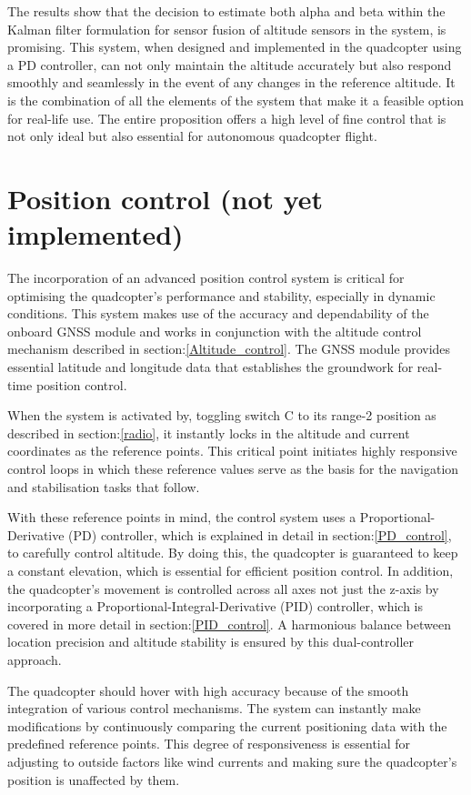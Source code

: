 \documentclass{report}
\begin{document}
The results show that the decision to estimate both alpha and beta within the
Kalman filter formulation for sensor fusion of altitude sensors in the system,
is promising. This system, when designed and implemented in the quadcopter using
a PD controller, can not only maintain the altitude accurately but also respond
smoothly and seamlessly in the event of any changes in the reference altitude.
It is the combination of all the elements of the system that make it a feasible
option for real-life use. The entire proposition offers a high level of fine
control that is not only ideal but also essential for autonomous quadcopter
flight.

\section{Position control (not yet implemented)}
The incorporation of an advanced position control system is critical for
optimising the quadcopter's performance and stability, especially in dynamic
conditions. This system makes use of the accuracy and dependability of the
onboard GNSS module and works in conjunction with the altitude control mechanism
described in section:\ref{Altitude_control}. The GNSS module provides essential
latitude and longitude data that establishes the groundwork for real-time
position control.

When the system is activated by, toggling switch C to its range-2 position as
described in section:\ref{radio}, it instantly locks in the altitude and current
coordinates as the reference points. This critical point initiates highly
responsive control loops in which these reference values serve as the basis for
the navigation and stabilisation tasks that follow.

With these reference points in mind, the control system uses a
Proportional-Derivative (PD) controller, which is explained in detail in
section:\ref{PD_control}, to carefully control altitude. By doing this, the
quadcopter is guaranteed to keep a constant elevation, which is essential for
efficient position control. In addition, the quadcopter's movement is controlled
across all axes not just the z-axis by incorporating a
Proportional-Integral-Derivative (PID) controller, which is covered in more
detail in section:\ref{PID_control}. A harmonious balance between location
precision and altitude stability is ensured by this dual-controller approach. 

The quadcopter should hover with high accuracy because of the smooth integration
of various control mechanisms. The system can instantly make modifications by
continuously comparing the current positioning data with the predefined
reference points. This degree of responsiveness is essential for adjusting to
outside factors like wind currents and making sure the quadcopter's position is
unaffected by them.
\end{document}
